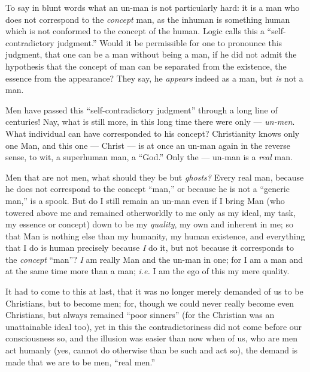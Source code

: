 To say in blunt words what an un-man is not particularly hard: it is a man who 
does not correspond to the \textit{concept} man, as the inhuman is something 
human which is not conformed to the concept of the human. Logic calls this a 
``self-contradictory judgment.'' Would it be permissible for one to 
pronounce this judgment, that one can be a man without being a man, if he did 
not admit the hypothesis that the concept of man can be separated from the 
existence, the essence from the appearance? They say, he \textit{appears} 
indeed as a man, but \textit{is} not a man.

Men have passed this ``self-contradictory judgment'' through a long line of 
centuries! Nay, what is still more, in this long time there were only --- \textit{un-men}. What individual can have corresponded to his concept? 
Christianity knows only one Man, and this one --- Christ --- is at once an 
un-man again in the reverse sense, to wit, a superhuman man, a ``God.'' Only 
the --- un-man is a \textit{real} man.

Men that are not men, what should they be but \textit{ghosts?} Every real man, 
because he does not correspond to the concept ``man,'' or because he is not 
a ``generic man,'' is a spook. But do I still remain an un-man even if I 
bring Man (who towered above me and remained otherworldly to me only as my 
ideal, my task, my essence or concept) down to be my \textit{quality}, my own 
and inherent in me; so that Man is nothing else than my humanity, my human 
existence, and everything that I do is human precisely because \textit{I} do 
it, but not because it corresponds to the \textit{concept} ``man''? 
\textit{I} am really Man and the un-man in one; for I am a man and at the same 
time more than a man; \textit{i.e.} I am the ego of this my mere quality.

It had to come to this at last, that it was no longer merely demanded of us to 
be Christians, but to become men; for, though we could never really become 
even Christians, but always remained ``poor sinners'' (for the Christian was 
an unattainable ideal too), yet in this the contradictoriness did not come 
before our consciousness so, and the illusion was easier than now when of us, 
who are men act humanly (yes, cannot do otherwise than be such and act so), 
the demand is made that we are to be men, ``real men.''

